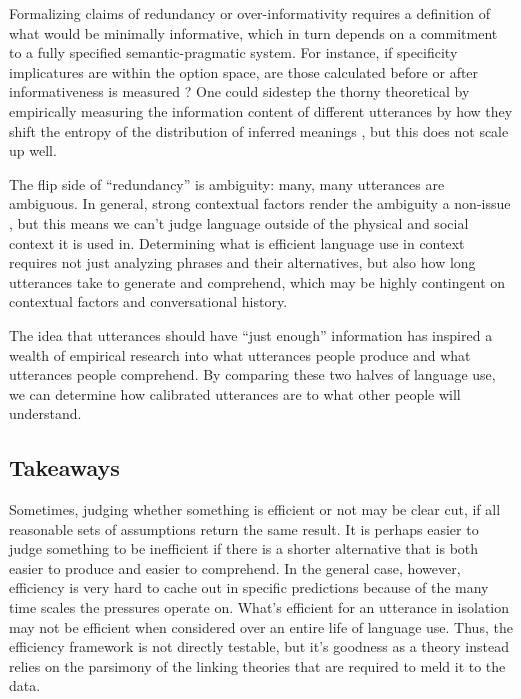 \documentclass[]{article}
\begin{document}
Formalizing claims of redundancy or over-informativity requires a definition of what would be minimally informative, which in turn depends on a commitment to a fully specified semantic-pragmatic system. For instance, if specificity implicatures are within the option space, are those calculated before or after informativeness is measured \citep{bergen}? One could sidestep the thorny theoretical by empirically measuring the information content of different utterances by how they shift the entropy of the distribution of inferred meanings \citep{degen20200406}, but this does not scale up well. 

The flip side of ``redundancy'' is ambiguity: many, many utterances are ambiguous. In general, strong contextual factors render the ambiguity a non-issue \citep{piantadosi2012}, but this means we can't judge language outside of the physical and social context it is used in. Determining what is efficient language use in context requires not just analyzing phrases and their alternatives, but also how long utterances take to generate and comprehend, which may be highly contingent on contextual factors and conversational history. 

The idea that utterances should have ``just enough'' information has inspired a wealth of empirical research into what utterances people produce and what utterances people comprehend. By comparing these two halves of language use, we can determine how calibrated utterances are to what other people will understand. 


\subsection{Takeaways}
Sometimes, judging whether something is efficient or not may be clear cut, if all reasonable sets of assumptions return the same result. It is perhaps easier to judge something to be inefficient if there is a shorter alternative that is both easier to produce and easier to comprehend. In the general case, however, efficiency is very hard to cache out in specific predictions because of the many time scales the pressures operate on. What's efficient for an utterance in isolation may not be efficient when considered over an entire life of language use. Thus, the efficiency framework is not directly testable, but it's goodness as a theory instead relies on the parsimony of the linking theories that are required to meld it to the data. 
\end{document}
